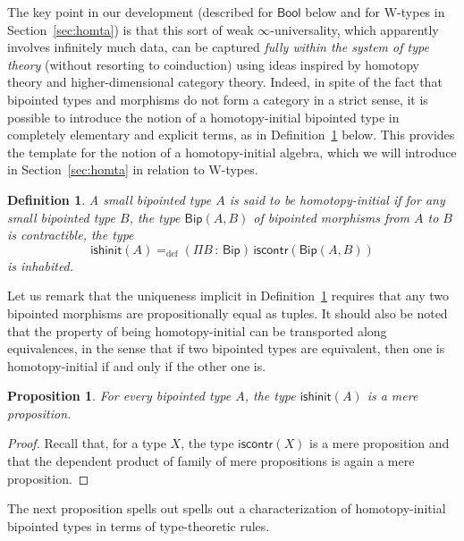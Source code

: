 \documentclass[10pt,a4paper,oneside,reqno]{amsart}
\numberwithin{equation}{section}
\theoremstyle{mythm}
\newtheorem{proposition}[theorem]{Proposition}
\theoremstyle{mydef}
\newtheorem{definition}[theorem]{Definition}
\theoremstyle{myrmk}
\newcommand{\ie}{\text{i.e.\ }}
\newcommand{\defeq}{=_{\mathrm{def}}}
\newcommand{\co}{\,{:}\,}
\newcommand{\iscontr}{\mathsf{iscontr}}
\newcommand{\ishinit}{\mathsf{ishinit}}
\newcommand{\Bool}{\mathsf{Bool}}
\newcommand{\W}{\mathrm{W}}
\newcommand{\Bip}{\mathsf{Bip}}
\newcommand{\BipHom}{\mathsf{Bip}}
\begin{document}
The key point in our development (described for $\Bool$ below and for $\W$-types in Section~\ref{sec:homta}) is that this sort of weak $\infty$-universality, which apparently involves infinitely much data, can be captured \emph{fully within the system of type theory} (without resorting to coinduction) using ideas inspired by homotopy theory and higher-dimensional category theory. Indeed, in spite of the fact that bipointed types and morphisms do not form a category in a strict sense, it is possible to introduce the  notion of a homotopy-initial bipointed type in completely elementary and explicit terms, as in Definition~\ref{def:BoolInit} below. This provides the template for the notion of a homotopy-initial algebra, which we will introduce in Section~\ref{sec:homta} in relation to $\W$-types.



\begin{definition}\label{def:BoolInit}
A small bipointed type $A$ is said to be \emph{homotopy-initial}  if for any small bipointed type $B$, the type $\BipHom(A,B)$ of bipointed morphisms from $A$ to $B$
is contractible, \ie the type
\[
\ishinit(A) \defeq (\Pi B \co \Bip) \, \iscontr(\BipHom(A, B) )
\] 
is inhabited.
\end{definition}

Let us remark that the uniqueness implicit in Definition~\ref{def:BoolInit} requires that any two bipointed morphisms are propositionally equal as tuples. It should also be noted that the property of being  homotopy-initial  can be transported along equivalences, in the sense that if two bipointed types are equivalent, then one is homotopy-initial if and only if the other one is.  

\begin{proposition} \label{thm:isbiphinitishprop} For every bipointed type $A$, the type $\ishinit(A)$ is a mere proposition.
\end{proposition}

\begin{proof} Recall that, for a type $X$, the type $\iscontr(X)$ is a mere proposition and that the dependent product of family of mere propositions is again a mere proposition. 
\end{proof} 

The next proposition spells out spells out a  characterization of homotopy-initial bipointed types in terms of type-theoretic rules.
\end{document}
